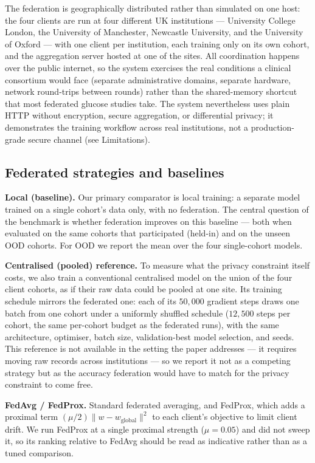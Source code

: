 \documentclass[10pt,letterpaper]{article}
\begin{document}
The federation is geographically distributed rather than simulated on one host:
the four clients are run at four different UK institutions --- University College
London, the University of Manchester, Newcastle University, and the University of
Oxford --- with one client per institution, each training only on its own cohort,
and the aggregation server hosted at one of the sites. All coordination happens
over the public internet, so the system exercises the real conditions a clinical
consortium would face (separate administrative domains, separate hardware,
network round-trips between rounds) rather than the shared-memory shortcut that
most federated glucose studies take. The system nevertheless uses plain HTTP
without encryption, secure aggregation, or differential privacy; it demonstrates
the training workflow across real institutions, not a production-grade secure
channel (see Limitations).

\subsection*{Federated strategies and baselines}

\textbf{Local (baseline).} Our primary comparator is local training: a separate
model trained on a single cohort's data only, with no federation. The central
question of the benchmark is whether federation improves on this baseline ---
both when evaluated on the same cohorts that participated (held-in) and on the
unseen OOD cohorts. For OOD we report the mean over the four single-cohort models.

\textbf{Centralised (pooled) reference.} To measure what the privacy constraint
itself costs, we also train a conventional centralised model on the union of the
four client cohorts, as if their raw data could be pooled at one site. Its
training schedule mirrors the federated one: each of its $50{,}000$ gradient
steps draws one batch from one cohort under a uniformly shuffled schedule
($12{,}500$ steps per cohort, the same per-cohort budget as the federated runs),
with the same architecture, optimiser, batch size, validation-best model
selection, and seeds. This reference is not available in the setting the paper
addresses --- it requires moving raw records across institutions --- so we
report it not as a competing strategy but as the accuracy federation would have
to match for the privacy constraint to come free.

\textbf{FedAvg / FedProx.} Standard federated averaging, and FedProx, which adds
a proximal term $(\mu/2)\lVert w - w_{\text{global}}\rVert^2$ to each client's
objective to limit client drift. We run FedProx at a single proximal strength
($\mu=0.05$) and did not sweep it, so its ranking relative to FedAvg should be
read as indicative rather than as a tuned comparison.
\end{document}
